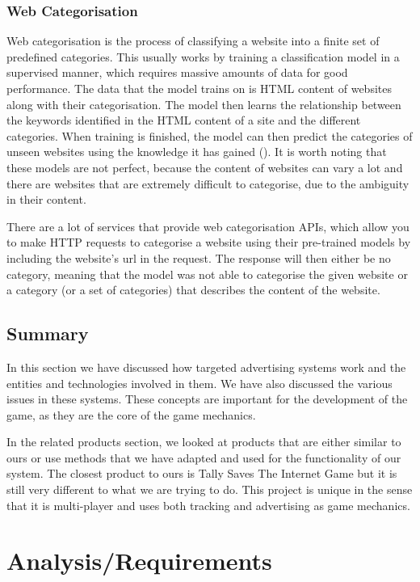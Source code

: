 \documentclass{l4proj}
\begin{document}
\subsection{Web Categorisation}
Web categorisation is the process of classifying a website into a finite set of predefined categories. This usually works by training a classification model in a supervised manner, which requires massive amounts of data for good performance. The data that the model trains on is HTML content of websites along with their categorisation. The model then learns the relationship between the keywords identified in the HTML content of a site and the different categories. When training is finished, the model can then predict the categories of unseen websites using the knowledge it has gained (\cite{webcat}). It is worth noting that these models are not perfect, because the content of websites can vary a lot and there are websites that are extremely difficult to categorise, due to the ambiguity in their content. 

There are a lot of services that provide web categorisation APIs, which allow you to make HTTP requests to categorise a website using their pre-trained models by including the website's url in the request. The response will then either be no category, meaning that the model was not able to categorise the given website or a category (or a set of categories) that describes the content of the website.

\section{Summary}
In this section we have discussed how targeted advertising systems work and the entities and technologies involved in them. We have also discussed the various issues in these systems. These concepts are important for the development of the game, as they are the core of the game mechanics. 

In the related products section, we looked at products that are either similar to ours or use methods that we have adapted and used for the functionality of our system. The closest product to ours is Tally Saves The Internet Game but it is still very different to what we are trying to do. This project is unique in the sense that it is multi-player and uses both tracking and advertising as game mechanics. 

\chapter{Analysis/Requirements}
\end{document}
